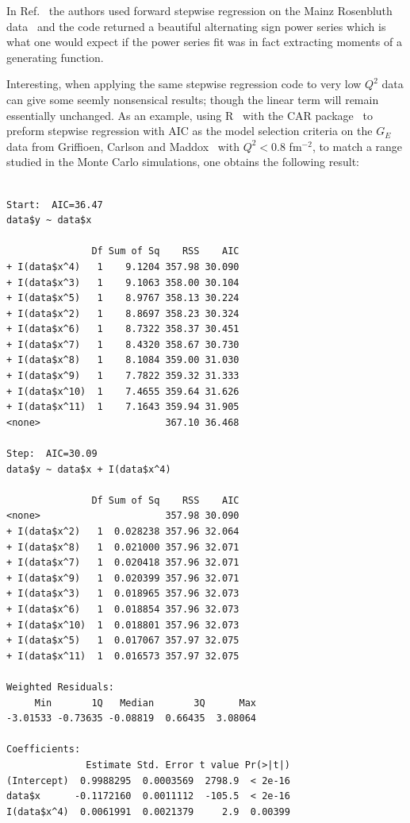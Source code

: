 \documentclass[10pt,superscriptaddress,aps,prc,twocolumn]{revtex4-1}
\begin{document}
\begin{appendix}
In Ref.~\cite{Higinbotham:2015rja} the authors used forward stepwise regression on the Mainz
Rosenbluth data~\cite{Bernauer:2010wm} and the code returned a beautiful alternating sign power 
series which is what one would expect if the power series fit was in fact extracting moments
of a generating function.   

Interesting, when applying the same stepwise regression code to very low $Q^2$ data can give
some seemly nonsensical results; though the linear term will remain essentially unchanged.   
As an example, using R~\cite{R} with the CAR package~\cite{car} to preform stepwise regression with AIC as the
model selection criteria on the $G_E$ data from Griffioen, 
Carlson and Maddox~\cite{Griffioen:2015hta} with $Q^2 < 0.8$ fm$^{-2}$, to match a range studied
in the Monte Carlo simulations, one obtains the following result:

\begin{Verbatim}[fontsize=\footnotesize]

Start:  AIC=36.47
data$y ~ data$x

               Df Sum of Sq    RSS    AIC
+ I(data$x^4)   1    9.1204 357.98 30.090
+ I(data$x^3)   1    9.1063 358.00 30.104
+ I(data$x^5)   1    8.9767 358.13 30.224
+ I(data$x^2)   1    8.8697 358.23 30.324
+ I(data$x^6)   1    8.7322 358.37 30.451
+ I(data$x^7)   1    8.4320 358.67 30.730
+ I(data$x^8)   1    8.1084 359.00 31.030
+ I(data$x^9)   1    7.7822 359.32 31.333
+ I(data$x^10)  1    7.4655 359.64 31.626
+ I(data$x^11)  1    7.1643 359.94 31.905
<none>                      367.10 36.468

Step:  AIC=30.09
data$y ~ data$x + I(data$x^4)

               Df Sum of Sq    RSS    AIC
<none>                      357.98 30.090
+ I(data$x^2)   1  0.028238 357.96 32.064
+ I(data$x^8)   1  0.021000 357.96 32.071
+ I(data$x^7)   1  0.020418 357.96 32.071
+ I(data$x^9)   1  0.020399 357.96 32.071
+ I(data$x^3)   1  0.018965 357.96 32.073
+ I(data$x^6)   1  0.018854 357.96 32.073
+ I(data$x^10)  1  0.018801 357.96 32.073
+ I(data$x^5)   1  0.017067 357.97 32.075
+ I(data$x^11)  1  0.016573 357.97 32.075

Weighted Residuals:
     Min       1Q   Median       3Q      Max 
-3.01533 -0.73635 -0.08819  0.66435  3.08064 

Coefficients:
              Estimate Std. Error t value Pr(>|t|)    
(Intercept)  0.9988295  0.0003569  2798.9  < 2e-16 
data$x      -0.1172160  0.0011112  -105.5  < 2e-16 
I(data$x^4)  0.0061991  0.0021379     2.9  0.00399 


\end{Verbatim}
\end{appendix}
\end{document}
